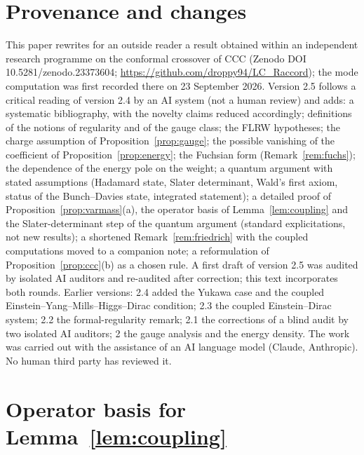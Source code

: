 \documentclass[11pt,a4paper]{article}
\theoremstyle{definition}
\begin{document}
\section*{Provenance and changes}
This paper rewrites for an outside reader a result obtained within an independent research programme on the conformal crossover of CCC (Zenodo DOI 10.5281/zenodo.23373604; \url{https://github.com/droppy94/LC_Raccord}); the mode computation was first recorded there on 23 September 2026. Version 2.5 follows a critical reading of version 2.4 by an AI system (not a human review) and adds: a systematic bibliography, with the novelty claims reduced accordingly; definitions of the notions of regularity and of the gauge class; the FLRW hypotheses; the charge assumption of Proposition~\ref{prop:gauge}; the possible vanishing of the coefficient of Proposition~\ref{prop:energy}; the Fuchsian form (Remark~\ref{rem:fuchs}); the dependence of the energy pole on the weight; a quantum argument with stated assumptions (Hadamard state, Slater determinant, Wald's first axiom, status of the Bunch--Davies state, integrated statement); a detailed proof of Proposition~\ref{prop:varmass}(a), the operator basis of Lemma~\ref{lem:coupling} and the Slater-determinant step of the quantum argument (standard explicitations, not new results); a shortened Remark~\ref{rem:friedrich} with the coupled computations moved to a companion note; a reformulation of Proposition~\ref{prop:ccc}(b) as a chosen rule. A first draft of version 2.5 was audited by isolated AI auditors and re-audited after correction; this text incorporates both rounds. Earlier versions: 2.4 added the Yukawa case and the coupled Einstein--Yang--Mills--Higgs--Dirac condition; 2.3 the coupled Einstein--Dirac system; 2.2 the formal-regularity remark; 2.1 the corrections of a blind audit by two isolated AI auditors; 2 the gauge analysis and the energy density. The work was carried out with the assistance of an AI language model (Claude, Anthropic). No human third party has reviewed it.

\appendix
\section{Operator basis for Lemma~\ref{lem:coupling}}
\label{app:basis}
\end{document}
